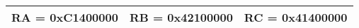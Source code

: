 \begin{table}[h!]
\centering
\begin{tabular}{|c|c|c|}
\hline
RA = 0xC1400000 & RB = 0x42100000 & RC = 0x41400000 \\
\hline
\end{tabular}
\caption*{}
\label{tab:q41}
\end{table}